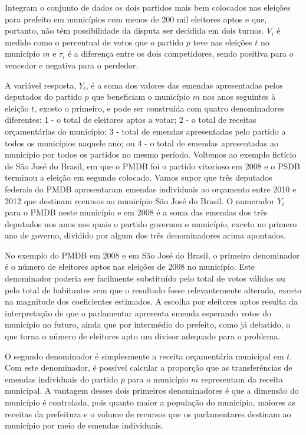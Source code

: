 Integram o conjunto de dados os dois partidos mais bem colocados nas eleições para prefeito em municípios com menos de 200 mil eleitores aptos e que, portanto, não têm possibilidade da disputa ser decidida em dois turnos. $V_{i}$ é medido como o percentual de votos que o partido $p$ teve nas eleições $t$ no município $m$ e $\tau_{i}$ é a diferença entre os dois competidores, sendo positiva para o vencedor e negativa para o perdedor. 

A variável resposta, $Y_{i}$, é a soma dos valores das emendas apresentadas pelos deputados do partido $p$ que beneficiam o município $m$ nos anos seguintes à eleição $t$, exceto o primeiro, e pode ser construída com quatro denominadores diferentes: 1 - o total de eleitores aptos a votar; 2 - o total de receitas orçamentárias do município; 3 - total de emendas apresentadas pelo partido a todos os municípios naquele ano; ou 4 - o total de emendas apresentadas ao município por todos os partidos no mesmo período. Voltemos ao exemplo fictício de São José do Brasil, em que o PMDB foi o partido vitorioso em 2008 e o PSDB terminou a eleição em segundo colocado. Vamos supor que três deputados federais do PMDB apresentaram emendas individuais ao orçamento entre 2010 e 2012 que destinam recursos ao município São José do Brasil. O numerador $Y_{i}$ para o PMDB neste município e em 2008 é a soma das emendas dos três deputados nos anos nos quais o partido governou o município, exceto no primero ano de governo, dividido por algum dos três denominadores acima apontados.

No exemplo do PMDB em 2008 e em São José do Brasil, o primeiro denominador é o número de eleitores aptos nas eleições de 2008 no município. Este denominador poderia ser facilmente substituído pelo total de votos válidos ou pelo total de habitantes sem que o resultado fosse relevantemente alterado, exceto na magnitude dos coeficientes estimados. A escolha por eleitores aptos resulta da interpretação de que o parlamentar apresenta emenda esperando votos do município no futuro, ainda que por intermédio do prefeito, como já debatido, o que torna o número de eleitores apto um divisor adequado para o problema.

O segundo denominador é simplesmente a receita orçamentária municipal em $t$. Com este denominador, é possível calcular a proporção que as transferências de emendas individuais do partido $p$ para o município $m$ representam da receita municipal. A vantagem desses dois primeiros denominadores é que a dimensão do município é controlada, pois quanto maior a população do município, maiores as receitas da prefeitura e o volume de recursos que os parlamentares destinam ao município por meio de emendas individuais.

